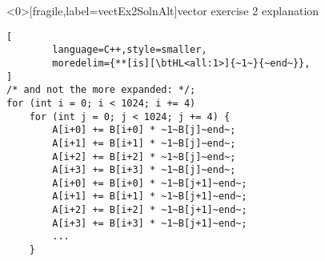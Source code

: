 \begin{frame}<0>[fragile,label=vectEx2SolnAlt]{vector exercise 2 explanation}
\begin{lstlisting}[
        language=C++,style=smaller,
        moredelim={**[is][\btHL<all:1>]{~1~}{~end~}},
]
/* and not the more expanded: */;
for (int i = 0; i < 1024; i += 4)
    for (int j = 0; j < 1024; j += 4) {
        A[i+0] += B[i+0] * ~1~B[j]~end~;
        A[i+1] += B[i+1] * ~1~B[j]~end~;
        A[i+2] += B[i+2] * ~1~B[j]~end~;
        A[i+3] += B[i+3] * ~1~B[j]~end~;
        A[i+0] += B[i+0] * ~1~B[j+1]~end~;
        A[i+1] += B[i+1] * ~1~B[j+1]~end~;
        A[i+2] += B[i+2] * ~1~B[j+1]~end~;
        A[i+3] += B[i+3] * ~1~B[j+1]~end~;
        ...
    }
\end{lstlisting}
\end{frame}
